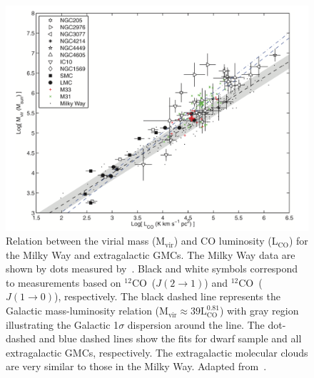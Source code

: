 \begin{figure}
\label{fig: mco}
\centering
\includegraphics[width=\textwidth]{../image_intro/mvirial_lco.png}
\caption[Relation between the virial mass and CO luminosity]{Relation between the virial mass (M$_{\mathrm{vir}}$) and CO luminosity (L$_{\mathrm{CO}}$) for the Milky Way and extragalactic GMCs. The Milky Way data are shown by dots measured by~\cite{Solomon87}. Black and white symbols correspond to measurements based on $^{12}$CO~($J(2\rightarrow 1)$) and $^{12}$CO~($J(1\rightarrow 0)$), respectively. The black dashed line represents the Galactic mass-luminosity relation (M$_{\mathrm{vir}} \approx 39{\mathrm L}^{0.81}_{\mathrm{CO}}$) with gray region illustrating the Galactic 1$\sigma$ dispersion around the line.
The dot-dashed and blue dashed lines show the fits for dwarf sample and all extragalactic GMCs, respectively.
The extragalactic molecular clouds are very similar to those in the Milky Way. Adapted from~\cite{Bolato08}.}
\end{figure}

